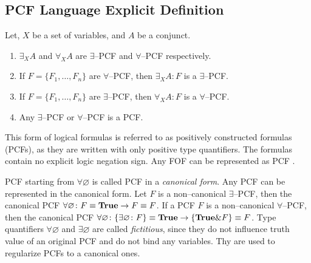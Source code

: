 \documentclass[a4paper,12pt]{article}
\begin{document}
\subsection{PCF Language Explicit Definition}

\begin{definition}
\label{def:pcf}
Let, $X$ be a set of variables, and $A$ be a conjunct.
\begin{enumerate}

\item $\exists_XA$ and $\forall_XA$ are $\exists$--PCF and $\forall$--PCF respectively.

\item If $F = \{F_1,\ldots,F_n\}$ are $\forall$--PCF, then $\exists_XA\colon F$ is a $\exists$--PCF.

\item If $F = \{F_1,\ldots,F_n\}$ are $\exists$--PCF, then $\forall_XA\colon F$ is a $\forall$--PCF.

\item Any $\exists$--PCF or $\forall$--PCF is a PCF.
\end{enumerate}
\end{definition}

This form of logical formulas is referred to as positively constructed formulas (PCFs), as they are written with only positive type quantifiers. The formulas contain no explicit logic negation sign. Any FOF can be represented as PCF \cite{ICDS2000}.

PCF starting from $\forall \varnothing$ is called PCF in a {\em canonical form}. Any PCF can be represented in the canonical form. Let $F$ is a non--canonical $\exists$--PCF, then the canonical PCF
$\forall \varnothing\colon F \equiv \text{\textbf{True}} \rightarrow F \equiv F$. If a PCF $F$ is a non--canonical $\forall$--PCF, then the canonical PCF $\forall \varnothing\colon\{\exists \varnothing\colon F\} \equiv \text{\textbf{True}} \rightarrow \{\text{\textbf{True}}\&F\} \equiv F$.  Type quantifiers $\forall \varnothing$ and $\exists \varnothing$ are called {\em fictitious}, since they do not influence truth value of an original PCF and do not bind any variables.  Thy are used to regularize PCFs to a canonical ones.
\end{document}
